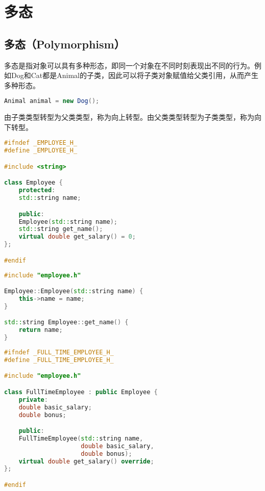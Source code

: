 \newpage

\section{多态}

\subsection{多态（Polymorphism）}

多态是指对象可以具有多种形态，即同一个对象在不同时刻表现出不同的行为。例如Dog和Cat都是Animal的子类，因此可以将子类对象赋值给父类引用，从而产生多种形态。

\vspace{-0.5cm}

\begin{lstlisting}[language=Java]
Animal animal = new Dog();
\end{lstlisting}

由子类类型转型为父类类型，称为向上转型。由父类类型转型为子类类型，称为向下转型。\\


\begin{lstlisting}[language=C++]
#ifndef _EMPLOYEE_H_
#define _EMPLOYEE_H_

#include <string>

class Employee {
    protected:
    std::string name;

    public:
    Employee(std::string name);
    std::string get_name();
    virtual double get_salary() = 0;
};

#endif
\end{lstlisting}

\begin{lstlisting}[language=C++]
#include "employee.h"

Employee::Employee(std::string name) {
    this->name = name;
}

std::string Employee::get_name() {
    return name;
}
\end{lstlisting}

\begin{lstlisting}[language=C++]
#ifndef _FULL_TIME_EMPLOYEE_H_
#define _FULL_TIME_EMPLOYEE_H_

#include "employee.h"

class FullTimeEmployee : public Employee {
    private:
    double basic_salary;
    double bonus;

    public:
    FullTimeEmployee(std::string name,
                     double basic_salary,
                     double bonus);
    virtual double get_salary() override;
};

#endif
\end{lstlisting}

